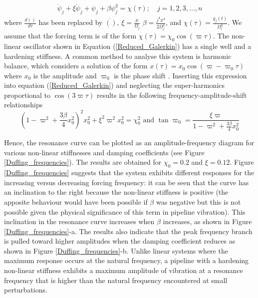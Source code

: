\documentclass[3p,doublespacing,authoryear,11pt]{elsarticle} %
\begin{document}
 \begin{equation}\label{Reduced_Galerkin}
 \begin{array}{l } 
  \displaystyle  \ddot{\psi}_j + \xi \dot{\psi}_j   +  \psi_j  + \beta \psi_j^3  = \chi(\tau) ; \quad j=1,2,3,..., n
  \end{array}  
\end{equation}
where $\frac{d()}{d \tau}$ has been replaced by $\dot{()}$,  $\xi = \frac{\mu}{\Omega_j}$ $\beta = \frac{ j^4 \pi^4}{2 \Omega_j^2}$, and $\chi(\tau) = \frac{q_j(t)}{\Omega_i^2} $. We assume that the forcing term is of the form $\chi(\tau) = \chi_0 \cos \left( \varpi \tau \right)$.  The non-linear oscillator shown in Equation (\ref{Reduced_Galerkin}) has a single well and a hardening stiffness. A common method to analyse this system is harmonic balance, which considers a solution of the form $x(\tau) = x_0 \cos  \left( \varpi - \varpi_0 \tau \right) $ where $x_0$ is the amplitude and $\varpi_0$ is the phase shift \citep{Wagner:2016tx}. Inserting this expression into equation (\ref{Reduced_Galerkin}) and neglecting the super-harmonics proportional to $\cos \left( 3 \varpi \tau\right)$ results in the following frequency-amplitude-shift relationships \[ \left( 1- \varpi^2 +\frac{3 \beta}{4} x_0^2 \right)^2  x_0^2 +  \xi^2 \varpi^2 x_0^2  =  \chi_0^2 \text{   and   } \tan \varpi_0 = \frac{\xi \varpi}{1-\varpi^2 + \frac{3 \beta}{4} x_0^2} \] 
 
Hence, the resonance curve can be plotted as an amplitude-frequency diagram for various non-linear stiffnesses and damping coefficients (see Figure \ref{Duffing_frequencies}). The results are obtained for $\chi_0= 0.2$ and $\xi = 0.12$. Figure \ref{Duffing_frequencies} suggests that the system exhibits different responses for the increasing versus decreasing forcing frequency: it can be seen that the curve has an inclination to the right because the non-linear stiffness is positive (the apposite behaviour would have been possible if $\beta$ was negative but this is not possible given the physical significance of this term in pipeline vibration). This inclination in the resonance curve increases when $\beta$ increases, as shown in Figure \ref{Duffing_frequencies}-a. The results also indicate that the peak frequency branch is pulled toward higher amplitudes when the damping coefficient reduces as shown in Figure \ref{Duffing_frequencies}-b. Unlike linear systems where the maximum response occurs at the natural frequency, a pipeline with a hardening non-linear stiffness exhibits a maximum amplitude of vibration at a resonance frequency that is higher than the natural frequency encountered at small perturbations.  
\end{document}
